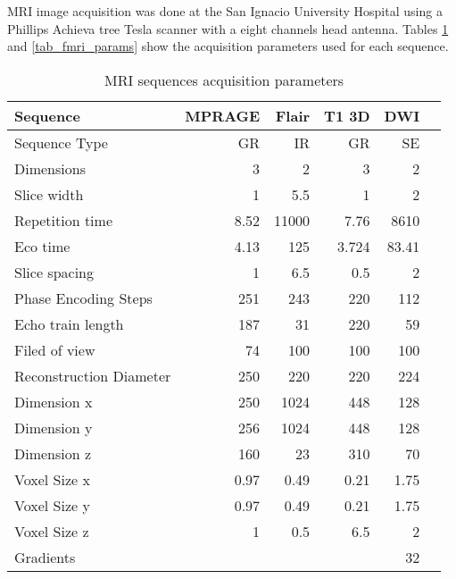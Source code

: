 MRI image acquisition was done at the San Ignacio University Hospital using a Phillips Achieva tree Tesla scanner with a eight channels head  antenna. Tables \ref{tab_mri_params} and \ref{tab_fmri_params} show the acquisition parameters used for each sequence. 
\begin{table}
	\centering
	\footnotesize
		\begin{tabular}{l|rrrrr}
				Sequence&MPRAGE	&Flair	&T1 3D &DWI\\ \hline				
				Sequence Type	&GR	&IR	&GR &SE\\ 
				Dimensions	&3	&2	&3 &2\\
				Slice width	&1	&5.5	&1 &2\\
				Repetition time	&8.52	&11000	&7.76 &8610\\
				Eco time	&4.13	&125	&3.724 &83.41\\
				Slice spacing	&1	&6.5	&0.5 &2\\
				Phase Encoding Steps	&251	&243	&220 &112\\
				Echo train length	&187	&31	&220 &59\\
				Filed of view	&74	&100	&100 &100\\
				Reconstruction	Diameter&250	&220	&220 &224\\\hline
				Dimension x &250	&1024 &448  &128 \\
				Dimension y &256	&1024 &448 &128 \\
				Dimension z &160	&23 &310 &70 \\ \hline
				Voxel Size x	&0.97 &0.49 &0.21  &1.75 \\
				Voxel Size y	&0.97 &0.49 &0.21 &1.75 \\
				Voxel Size z	&1  &0.5 &6.5 &2 \\ \hline
				Gradients   &    &    &    &    32 \\
		\end{tabular}
	\caption{MRI sequences acquisition parameters}
	\label{tab_mri_params}
\end{table}


